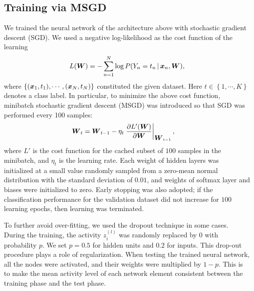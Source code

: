 \subsection{Training via MSGD}
We trained the neural network of the architecture above with stochastic gradient descent (SGD).
We used a negative log-likelihood as the cost function of the learning
\begin{equation}
  L(\mbox{\boldmath $W$}) = - \sum_{n=1}^{N} \log P(Y_n = t_n \,|\, \mbox{\boldmath $x$}_n, \mbox{\boldmath $W$}),
\end{equation}
%
where $\left\{(\mbox{\boldmath $x$}_1, t_1), \cdots, (\mbox{\boldmath $x$}_N, t_N)\right\}$ constituted the given dataset.
%
Here $t \in \left\{1, \cdots, K\right\}$ denotes a class label.
%
In particular, to minimize the above cost function, minibatch stochastic
gradient descent (MSGD) was introduced so that SGD was performed every
100 samples:
\begin{align} %
\bvec{W}_{t} &= \bvec{W}_{t-1} - \eta_{t} \left. \frac{\partial
L'(\bvec{W})}{\partial \bvec{W}} \right|_{\bvec{W}_{t-1}},
\end{align}
%
where $L'$ is the cost function for the cached subset of $100$ samples in
the minibatch, and $\eta_{t}$ is the learning rate.
Each weight of hidden layers was initialized at a small value randomly
sampled from a zero-mean normal distribution with the standard deviation
of $0.01$, and weights of softmax layer and biases were initialized to
zero.
Early stopping was also adopted; if the classification performance for the
validation dataset did not increase for $100$ learning epochs, then
learning was terminated.

To further avoid over-fitting, we used the dropout technique \cite{Hinton2012} in some cases.
During the training, the activity $z^{(l)}_i$ was randomly replaced by $0$ with probability $p$.
We set $p = 0.5$ for hidden units and $0.2$ for inputs.
This drop-out procedure plays a role of regularization.
When testing the trained neural network,
all the nodes were activated, and their weights were multiplied by $1-p$.
This is to make the mean activity level of each network element consistent
between the training phase and the test phase.
